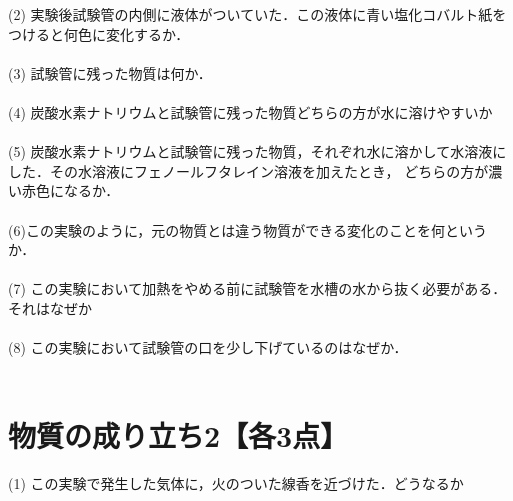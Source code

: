 \documentclass[autodetect-engine,dvi=dvipdfmx,ja=standard,
               a4j,11pt]{bxjsarticle}
\begin{document}
    (2) 実験後試験管の内側に液体がついていた．この液体に青い塩化コバルト紙をつけると何色に変化するか．\\\\

    (3) 試験管に残った物質は何か．\\\\

    (4) 炭酸水素ナトリウムと試験管に残った物質どちらの方が水に溶けやすいか\\\\

    (5) 炭酸水素ナトリウムと試験管に残った物質，それぞれ水に溶かして水溶液にした．その水溶液にフェノールフタレイン溶液を加えたとき，
    どちらの方が濃い赤色になるか．\\\\

    (6)この実験のように，元の物質とは違う物質ができる変化のことを何というか．\\\\

    (7) この実験において加熱をやめる前に試験管を水槽の水から抜く必要がある．それはなぜか\\\\

    (8) この実験において試験管の口を少し下げているのはなぜか．\\\\

    \clearpage
\section{物質の成り立ち2【各3点】}
\begin{figure}[htb]
        \centering
        \vspace{20pt} %
        \caption{}
\end{figure}
    (1) この実験で発生した気体に，火のついた線香を近づけた．どうなるか\\\\
\end{document}
